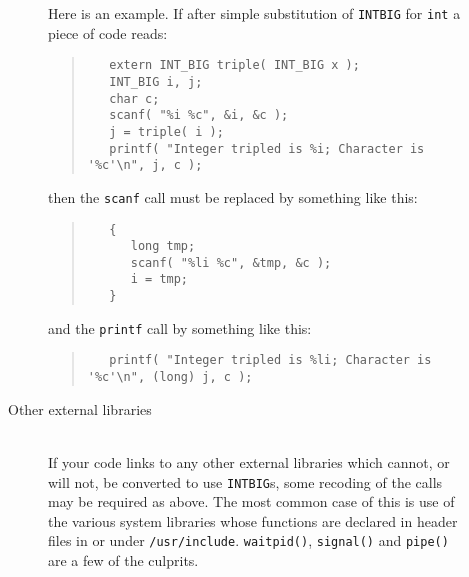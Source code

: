 \documentclass[twoside,11pt]{article}
\newcommand{\html}[1]{}
\renewcommand{\_}{\texttt{\symbol{95}}}
\newcommand{\file}[1]{{\tt #1}}
\newcommand{\cc}[1]{{\tt #1}}
\newcommand{\ditem}[1]{\item[#1]\mbox{}\\}
\newenvironment{squote}{\begin{quote}\begin{small}}{\end{small}\end{quote}}
\begin{document}
\begin{description}
\begin{description}
Here is an example.  If after simple substitution of \cc{INT\_BIG} for
\cc{int} a piece of code reads:
\begin{squote}
\begin{verbatim}
   extern INT_BIG triple( INT_BIG x );
   INT_BIG i, j;
   char c;
   scanf( "%i %c", &i, &c );
   j = triple( i );
   printf( "Integer tripled is %i; Character is '%c'\n", j, c );
\end{verbatim}
\end{squote}
then the \cc{scanf} call must be replaced by something like this: 
\begin{squote}
\begin{verbatim}
   {  
      long tmp; 
      scanf( "%li %c", &tmp, &c ); 
      i = tmp; 
   }
\end{verbatim}
\end{squote}
and the \cc{printf} call by something like this:
\begin{squote}
\begin{verbatim}
   printf( "Integer tripled is %li; Character is '%c'\n", (long) j, c );
\end{verbatim}
\end{squote}
\html{\begin{squote}\end{squote}}
%
\ditem{Other external libraries}
If your code links to any other external libraries
which cannot, or will not, be converted to use \cc{INT\_BIG}s,
some recoding of the calls may be required as above.
The most common case of this is use of the various system libraries
whose functions are declared in header files in or under \file{/usr/include}.
\cc{waitpid()}, \cc{signal()} and \cc{pipe()} are a few of the culprits.
\end{description}
%
\end{description}
\end{document}
